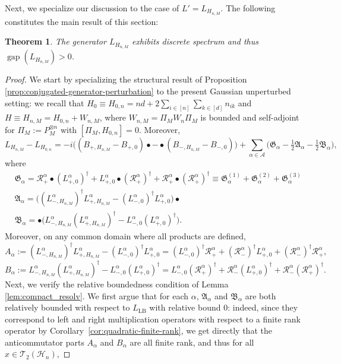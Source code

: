 \documentclass[11pt]{amsart}
\newcommand{\1}{\mathbbm{1}}
\theoremstyle{plain}
\newtheorem{theorem}{Theorem}[section]
\theoremstyle{definition}
\theoremstyle{remark}
\numberwithin{equation}{section}
\begin{document}
\noindent Next, we specialize our discussion to the case of $L'=L_{H_{n,M}}$. The following constitutes the main result of this section:

\begin{theorem}  
\label{corr:Gaussian_gap}
 The generator $L_{H_{n,M}}$ exhibits discrete spectrum and thus $\operatorname{gap}(L_{H_{n,M}})>0$.
\end{theorem}


\begin{proof}
We start by specializing the structural result of Proposition \ref{prop:conjugated-generator-perturbation} to the present Gaussian unperturbed setting: we recall that \(H_0\equiv H_{0,n}=nd+2\sum_{i\in[n]}\sum_{k\in[d]} n_{ik}\) and \(H\equiv H_{n,M}=H_{0,n}+W_{n,M}\), where \(W_{n,M}=\Pi_M W_n\Pi_M\) is bounded and self-adjoint for $\Pi_M:=P_M^{\otimes n}$ with \([\Pi_M,H_{0,n}]=0\). 
Moreover,
\[
L_{H_{n,M}}-L_{H_{0,n}}=-i\big((B_{+,H_{n,M}}-B_{+,0})\bullet -\bullet (B_{-,H_{n,M}}-B_{-,0})\big)+\sum_{\alpha\in\mathcal A}\big(\mathfrak G_\alpha -\tfrac12\mathfrak A_\alpha -\tfrac12\mathfrak B_\alpha\big),
\]
where
\begin{align*}
&\mathfrak G_\alpha=\mathcal R_+^\alpha \bullet  (L_{+,0}^\alpha)^\dagger+L_{+,0}^\alpha \bullet (\mathcal R_+^\alpha)^\dagger+\mathcal R_+^\alpha \bullet  (\mathcal R_+^\alpha)^\dagger\equiv \mathfrak{G}_\alpha^{(1)}+\mathfrak{G}_\alpha^{(2)}+\mathfrak{G}_\alpha^{(3)}\\
&\mathfrak A_\alpha=\big((L_{-,H_{n,M}}^\alpha)^\dagger L_{+,H_{n,M}}^\alpha-(L_{-,0}^\alpha)^\dagger L_{+,0}^\alpha\big)\bullet \\
&\mathfrak B_\alpha=\bullet \big(L_{-,H_{n,M}}^\alpha (L_{+,H_{n,M}}^\alpha)^\dagger-L_{-,0}^\alpha (L_{+,0}^\alpha)^\dagger\big).
\end{align*}
Moreover, on any common domain where all products are defined,
\[
A_\alpha:=(L_{-,H_{n,M}}^\alpha)^\dagger L_{+,H_{n,M}}^\alpha-(L_{-,0}^\alpha)^\dagger L_{+,0}^\alpha=(L_{-,0}^\alpha)^\dagger \mathcal R_+^\alpha+(\mathcal R_-^\alpha)^\dagger L_{+,0}^\alpha+(\mathcal R_-^\alpha)^\dagger \mathcal R_+^\alpha,
\]
\[
B_\alpha:=L_{-,H_{n,M}}^\alpha (L_{+,H_{n,M}}^\alpha)^\dagger-L_{-,0}^\alpha (L_{+,0}^\alpha)^\dagger=L_{-,0}^\alpha (\mathcal R_+^\alpha)^\dagger+\mathcal R_-^\alpha (L_{+,0}^\alpha)^\dagger+\mathcal R_-^\alpha (\mathcal R_+^\alpha)^\dagger.
\]
Next, we verify the relative boundedness condition of Lemma \ref{lem:compact_resolv}. We first argue that for each $\alpha$, $\mathfrak{A}_\alpha$ and $\mathfrak{B}_\alpha$ are both relatively bounded with respect to $L_{\operatorname{LB}}$ with relative bound $0$: indeed, since they correspond to left and right multiplication operators with respect to a finite rank operator by Corollary~\ref{cor:quadratic-finite-rank}, we get directly that the anticommutator parts $A_\alpha$ and $B_\alpha$ are all finite rank, and thus for all $x\in\mathscr{T}_2(\mathcal{H}_n)$,

\end{proof}
\end{document}
